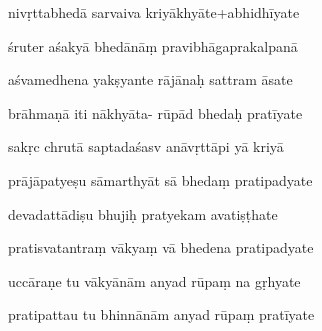 \documentclass[article,12pt,a4paper]{memoir}%
\newcounter{parCount}
\begin{document}
	  
	  \pstart {} nivṛttabhedā sarvaiva kriyākhyāte+abhidhīyate 
	{}
	\pend%
      

	  
	  \pstart \leavevmode%
	śruter aśakyā bhedānāṃ pravibhāgaprakalpanā 
	{}
	\pend%
      

	  
	  \pstart {} aśvamedhena yakṣyante rājānaḥ sattram āsate 
	{}
	\pend%
      

	  
	  \pstart \leavevmode%
	brāhmaṇā iti nākhyāta- rūpād bhedaḥ pratīyate 
	{}
	\pend%
      

	  
	  \pstart {} sakṛc chrutā saptadaśasv anāvṛttāpi yā kriyā 
	{}
	\pend%
      

	  
	  \pstart \leavevmode%
	prājāpatyeṣu sāmarthyāt sā bhedaṃ pratipadyate 
	{}
	\pend%
      

	  
	  \pstart {} devadattādiṣu bhujiḥ pratyekam avatiṣṭhate 
	{}
	\pend%
      

	  
	  \pstart \leavevmode%
	pratisvatantraṃ vākyaṃ vā bhedena pratipadyate 
	{}
	\pend%
      

	  
	  \pstart {} uccāraṇe tu vākyānām anyad rūpaṃ na gṛhyate 
	{}
	\pend%
      

	  
	  \pstart \leavevmode%
	pratipattau tu bhinnānām anyad rūpaṃ pratīyate 
	{}
	\pend%
      
\end{document}
